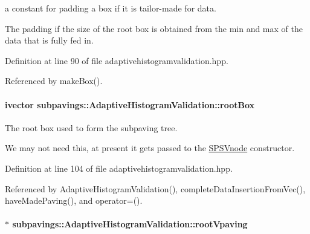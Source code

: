 a constant for padding a box if it is tailor-\/made for data. 

\-The padding if the size of the root box is obtained from the min and max of the data that is fully fed in. 

\-Definition at line 90 of file adaptivehistogramvalidation.\-hpp.



\-Referenced by make\-Box().

\hypertarget{classsubpavings_1_1AdaptiveHistogramValidation_aa8a961766f97013134d73f1735f3516c}{
\paragraph[{root\-Box}]{\setlength{\rightskip}{0pt plus 5cm}ivector {\bf subpavings\-::\-Adaptive\-Histogram\-Validation\-::root\-Box}}}\label{classsubpavings_1_1AdaptiveHistogramValidation_aa8a961766f97013134d73f1735f3516c}


\-The root box used to form the subpaving tree. 

\-We may not need this, at present it gets passed to the \hyperlink{classsubpavings_1_1SPSVnode}{\-S\-P\-S\-Vnode} constructor. 

\-Definition at line 104 of file adaptivehistogramvalidation.\-hpp.



\-Referenced by \-Adaptive\-Histogram\-Validation(), complete\-Data\-Insertion\-From\-Vec(), have\-Made\-Paving(), and operator=().

\hypertarget{classsubpavings_1_1AdaptiveHistogramValidation_a811e21423987027452237cabf38c008c}{
\paragraph[{root\-Vpaving}]{$\ast$ {\bf subpavings\-::\-Adaptive\-Histogram\-Validation\-::root\-Vpaving}}}\label{classsubpavings_1_1AdaptiveHistogramValidation_a811e21423987027452237cabf38c008c}


